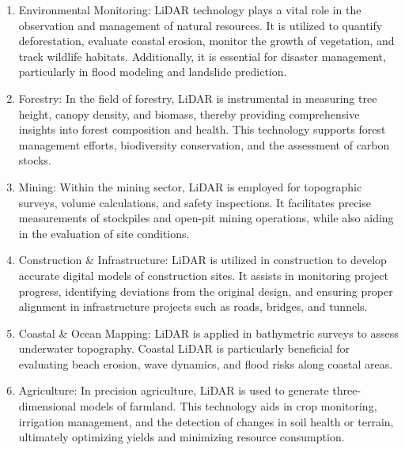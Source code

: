 \documentclass{article}
\begin{document}
\begin{enumerate}
    \item  Environmental Monitoring: LiDAR technology plays a vital role in the observation and management of natural resources. It is utilized to quantify deforestation, evaluate coastal erosion, monitor the growth of vegetation, and track wildlife habitats. Additionally, it is essential for disaster management, particularly in flood modeling and landslide prediction.
    \item Forestry: In the field of forestry, LiDAR is instrumental in measuring tree height, canopy density, and biomass, thereby providing comprehensive insights into forest composition and health. This technology supports forest management efforts, biodiversity conservation, and the assessment of carbon stocks.
    \item Mining: Within the mining sector, LiDAR is employed for topographic surveys, volume calculations, and safety inspections. It facilitates precise measurements of stockpiles and open-pit mining operations, while also aiding in the evaluation of site conditions.
    \item Construction \& Infrastructure: LiDAR is utilized in construction to develop accurate digital models of construction sites. It assists in monitoring project progress, identifying deviations from the original design, and ensuring proper alignment in infrastructure projects such as roads, bridges, and tunnels.
    \item Coastal \& Ocean Mapping: LiDAR is applied in bathymetric surveys to assess underwater topography. Coastal LiDAR is particularly beneficial for evaluating beach erosion, wave dynamics, and flood risks along coastal areas.
    \item Agriculture: In precision agriculture, LiDAR is used to generate three-dimensional models of farmland. This technology aids in crop monitoring, irrigation management, and the detection of changes in soil health or terrain, ultimately optimizing yields and minimizing resource consumption.
    
\end{enumerate}



\end{document}
